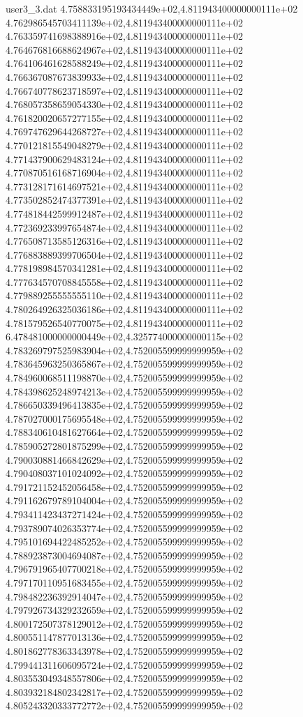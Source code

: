 \begin{filecontents}{user3_3.dat}
4.758833195193434449e+02,4.811943400000000111e+02
4.762986545703411139e+02,4.811943400000000111e+02
4.763359741698388916e+02,4.811943400000000111e+02
4.764676816688624967e+02,4.811943400000000111e+02
4.764106461628588249e+02,4.811943400000000111e+02
4.766367087673839933e+02,4.811943400000000111e+02
4.766740778623718597e+02,4.811943400000000111e+02
4.768057358659054330e+02,4.811943400000000111e+02
4.761820020657277155e+02,4.811943400000000111e+02
4.769747629644268727e+02,4.811943400000000111e+02
4.770121815549048279e+02,4.811943400000000111e+02
4.771437900629483124e+02,4.811943400000000111e+02
4.770870516168716904e+02,4.811943400000000111e+02
4.773128171614697521e+02,4.811943400000000111e+02
4.773502852474377391e+02,4.811943400000000111e+02
4.774818442599912487e+02,4.811943400000000111e+02
4.772369233997654874e+02,4.811943400000000111e+02
4.776508713585126316e+02,4.811943400000000111e+02
4.776883889399706504e+02,4.811943400000000111e+02
4.778198984570341281e+02,4.811943400000000111e+02
4.777634570708845558e+02,4.811943400000000111e+02
4.779889255555555110e+02,4.811943400000000111e+02
4.780264926325036186e+02,4.811943400000000111e+02
4.781579526540770075e+02,4.811943400000000111e+02
6.478481000000000449e+02,4.325774000000000115e+02
4.783269797525983904e+02,4.752005599999999959e+02
4.783645963250365867e+02,4.752005599999999959e+02
4.784960068511198870e+02,4.752005599999999959e+02
4.784398625248974213e+02,4.752005599999999959e+02
4.786650339496413835e+02,4.752005599999999959e+02
4.787027000175695548e+02,4.752005599999999959e+02
4.788340610481627664e+02,4.752005599999999959e+02
4.785905272801875299e+02,4.752005599999999959e+02
4.790030881466842629e+02,4.752005599999999959e+02
4.790408037101024092e+02,4.752005599999999959e+02
4.791721152452056458e+02,4.752005599999999959e+02
4.791162679789104004e+02,4.752005599999999959e+02
4.793411423437271424e+02,4.752005599999999959e+02
4.793789074026353774e+02,4.752005599999999959e+02
4.795101694422485252e+02,4.752005599999999959e+02
4.788923873004694087e+02,4.752005599999999959e+02
4.796791965407700218e+02,4.752005599999999959e+02
4.797170110951683455e+02,4.752005599999999959e+02
4.798482236392914047e+02,4.752005599999999959e+02
4.797926734329232659e+02,4.752005599999999959e+02
4.800172507378129012e+02,4.752005599999999959e+02
4.800551147877013136e+02,4.752005599999999959e+02
4.801862778363343978e+02,4.752005599999999959e+02
4.799441311606095724e+02,4.752005599999999959e+02
4.803553049348557806e+02,4.752005599999999959e+02
4.803932184802342817e+02,4.752005599999999959e+02
4.805243320333772772e+02,4.752005599999999959e+02

\end{filecontents}
